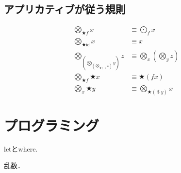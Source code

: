 \documentclass[twocolumn]{jsbook}
\newcommand{\applicativefunc}{\bigotimes}
\newcommand{\dollar}{\mathop{\$}}
\newcommand{\mapfunc}{\bigodot}
\newcommand{\pure}{\bigstar}
\newcommand{\specialkeyword}[1]{\textsf{#1}}
\newcommand{\identity}{\specialkeyword{id}}
\begin{document}
\section{アプリカティブが従う規則}

\begin{align}
\applicativefunc_{\pure f}x&\equiv\mapfunc_fx\\
\applicativefunc_{\pure\identity}x&\equiv x\\
\applicativefunc_{\left(\applicativefunc_{\left(\applicativefunc_{\pure(\cdot)}x\right)}y\right)}z&\equiv\applicativefunc_x\left(\applicativefunc_yz\right)\\
\applicativefunc_{\pure f}\pure x&\equiv\pure(fx)\\
\applicativefunc_x\pure y&\equiv\applicativefunc_{\pure(\dollar y)}x
\end{align}


\chapter{プログラミング}

letとwhere.

乱数．
\end{document}
